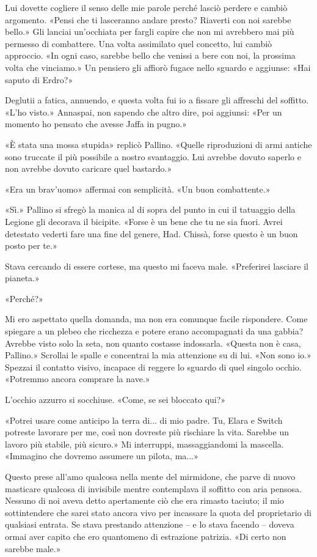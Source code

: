 Lui dovette cogliere il senso delle mie parole perché lasciò perdere e
cambiò argomento. «Pensi che ti lasceranno andare presto? Riaverti con
noi sarebbe bello.» Gli lanciai un'occhiata per fargli capire che non mi
avrebbero mai più permesso di combattere. Una volta assimilato quel
concetto, lui cambiò approccio. «In ogni caso, sarebbe bello che venissi
a bere con noi, la prossima volta che vinciamo.» Un pensiero gli affiorò
fugace nello sguardo e aggiunse: «Hai saputo di Erdro?»

Deglutii a fatica, annuendo, e questa volta fui io a fissare gli
affreschi del soffitto. «L'ho visto.» Annaspai, non sapendo che altro
dire, poi aggiunsi: «Per un momento ho pensato che avesse Jaffa in
pugno.»

«È stata una mossa stupida» replicò Pallino. «Quelle riproduzioni di
armi antiche sono truccate il più possibile a nostro svantaggio. Lui
avrebbe dovuto saperlo e non avrebbe dovuto caricare quel bastardo.»

«Era un brav'uomo» affermai con semplicità. «Un buon combattente.»

«Sì.» Pallino si sfregò la manica al di sopra del punto in cui il
tatuaggio della Legione gli decorava il bicipite. «Forse è un bene che
tu ne sia fuori. Avrei detestato vederti fare una fine del genere, Had.
Chissà, forse questo è un buon posto per te.»

Stava cercando di essere cortese, ma questo mi faceva male. «Preferirei
lasciare il pianeta.»

«Perché?»

Mi ero aspettato quella domanda, ma non era comunque facile rispondere.
Come spiegare a un plebeo che ricchezza e potere erano accompagnati da
una gabbia? Avrebbe visto solo la seta, non quanto costasse indossarla.
«Questa non è casa, Pallino.» Scrollai le spalle e concentrai la mia
attenzione su di lui. «Non sono io.» Spezzai il contatto visivo,
incapace di reggere lo sguardo di quel singolo occhio. «Potremmo ancora
comprare la nave.»

L'occhio azzurro si socchiuse. «Come, se sei bloccato qui?»

«Potrei usare come anticipo la terra di... di mio padre. Tu, Elara e
Switch potreste lavorare per me, così non dovreste più rischiare la
vita. Sarebbe un lavoro più stabile, più sicuro.» Mi interruppi,
massaggiandomi la mascella. «Immagino che dovremo assumere un pilota,
ma...»

Questo prese all'amo qualcosa nella mente del mirmidone, che parve di
nuovo masticare qualcosa di invisibile mentre contemplava il soffitto
con aria pensosa. Nessuno di noi aveva detto apertamente ciò che era
rimasto taciuto; il mio sottintendere che sarei stato ancora vivo per
incassare la quota del proprietario di qualsiasi entrata. Se stava
prestando attenzione -- e lo stava facendo -- doveva ormai aver capito
che ero quantomeno di estrazione patrizia. «Di certo non sarebbe male.»

